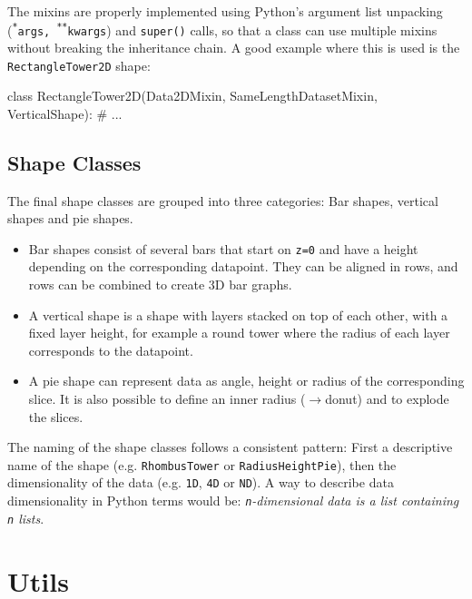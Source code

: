 \noindent The mixins are properly implemented using Python's argument list
unpacking (\texttt{\textsuperscript{*}args, \textsuperscript{**}kwargs}) and
\texttt{super()} calls, so that a class can use multiple mixins without breaking
the inheritance chain. A good example where this is used is the
\texttt{RectangleTower2D} shape:

\vspace{.5\baselineskip}

\begin{pythoncode}
class RectangleTower2D(Data2DMixin,
    SameLengthDatasetMixin, VerticalShape):
    # ...
\end{pythoncode}

\subsection{Shape Classes}\label{subsec:architecture:shapes:classes}

The final shape classes are grouped into three categories: Bar shapes, vertical
shapes and pie shapes.

\begin{itemize}
	\item Bar shapes consist of several bars that start on \texttt{z=0} and have a
		height depending on the corresponding datapoint. They can be aligned in
		rows, and rows can be combined to create 3D bar graphs.
	\item A vertical shape is a shape with layers stacked on top of each other,
		with a fixed layer height, for example a round tower where the radius of
		each layer corresponds to the datapoint.
	\item A pie shape can represent data as angle, height or radius of the
		corresponding slice. It is also possible to define an inner radius
		($\rightarrow$donut) and to explode the slices.
\end{itemize}

\noindent The naming of the shape classes follows a consistent pattern: First a
descriptive name of the shape (e.g. \texttt{RhombusTower} or
\texttt{RadiusHeightPie}), then the dimensionality of the data (e.g.
\texttt{1D}, \texttt{4D} or \texttt{ND}). A way to describe data dimensionality
in Python terms would be: \emph{\texttt{n}-dimensional data is a list containing
\texttt{n} lists}.


\section{Utils}\label{sec:architecture:utils}

